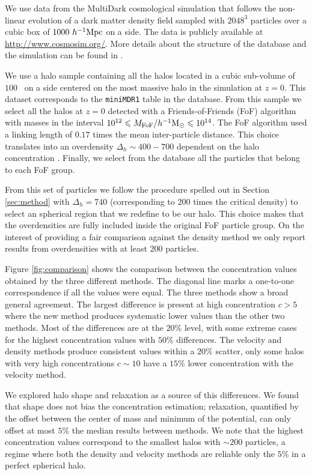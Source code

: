 \documentclass[a4,useAMS,usenatbib,usegraphicx]{mn2e}
\newcommand{\hMpc}{{\ifmmode{h^{-1}{\rm Mpc}}\else{$h^{-1}$Mpc}\fi}}
\newcommand{\hMsun}{{\ifmmode{h^{-1}{\rm {M_{\odot}}}}\else{$h^{-1}{\rm{M_{\odot}}}$}\fi}}
\begin{document}
We use data from the MultiDark cosmological simulation that follows
the non-linear evolution of a dark matter density field sampled with
$2048^3$ particles over a cubic box of $1000\ \hMpc$ on a side.  
The data is publicly available at \url{http://www.cosmosim.org/}.
More details about the structure of the database and the simulation
can be found in \citep{2013AN....334..691R}.

We use a halo sample containing all the halos located in a cubic
sub-volume of $100$ \hMpc\ on a side centered on the most massive halo
in the simulation at $z=0$.
This dataset corresponds to the \texttt{miniMDR1}
table in the  database.  
From this sample we select all the halos at $z=0$ detected
with a Friends-of-Friends (FoF) algorithm with masses in the interval
$10^{12}\leq M_{\rm FoF}/\hMsun \leq 10^{14}$.  
The FoF algorithm used a linking length of $0.17$ times the mean
inter-particle distance. This choice translates into an overdensity
$\Delta_h\sim  400-700$ dependent on the halo concentration \citep{More2011}.
Finally, we select from the database all the particles that belong to
each FoF group.

From this set of particles we follow the procedure spelled out in
Section \ref{sec:method} with $\Delta_h=740$ (corresponding to $200$
times the critical density) to select an spherical region that we
redefine to be our halo.  
This choice makes that the overdensities are fully included inside the
original FoF particle group.   
On the interest of providing a fair comparison against the density method we
only report results from overdensities with at least $200$ particles. 

Figure \ref{fig:comparison} shows the comparison between the
concentration values obtained by the three different methods. 
The diagonal line marks a one-to-one correspondence if all the values
were equal.
The three methods show a broad general agreement. 
The largest difference is present at high concentration $c>5$ where
the new method produces systematic lower values than the other two
methods. Most of the differences are at the $20\%$ level, with some
extreme cases for the highest concentration values with $50\%$
differences.  The velocity and density methods produce consistent
values within a $20\%$ scatter, only some halos with very high
concentrations $c\sim 10$ have a $15\%$ lower concentration with the
velocity method. 

We explored halo shape and relaxation as a source of this
differences. We found that shape does not bias the concentration
estimation; relaxation, quantified by the
offset between the center of mass and minimum of the potential, can
only offset at most $5\%$ the median results between methods.  
We note that the highest concentration values correspond to the smallest halos
with $\sim 200$ particles, a regime where both the density and
velocity methods are reliable only the $5\%$ in a perfect spherical
halo.  
\end{document}

